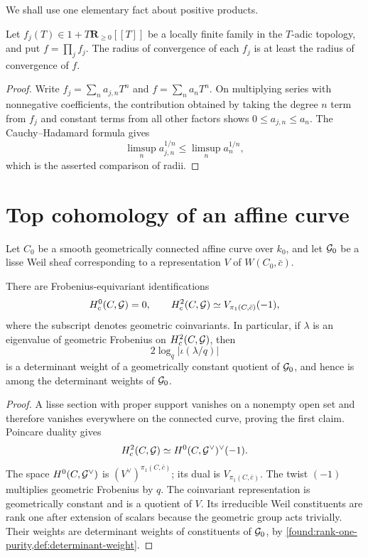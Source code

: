 We shall use one elementary fact about positive products.

\begin{lemma}
\label{lem:positive-product-radius}
Let \(f_j(T)\in1+T\mathbf R_{\geq0}[[T]]\) be a locally finite family in
the \(T\)-adic topology, and put \(f=\prod_j f_j\).  The radius of
convergence of each \(f_j\) is at least the radius of convergence of
\(f\).
\end{lemma}

\begin{proof}
Write \(f_j=\sum_na_{j,n}T^n\) and \(f=\sum_na_nT^n\).  On multiplying
series with nonnegative coefficients, the contribution obtained by
taking the degree \(n\) term from \(f_j\) and constant terms from all
other factors shows \(0\leq a_{j,n}\leq a_n\).  The
Cauchy--Hadamard formula gives
\[
  \limsup_n a_{j,n}^{1/n}
  \leq\limsup_n a_n^{1/n},
\]
which is the asserted comparison of radii.
\end{proof}

\section{Top cohomology of an affine curve}

Let \(C_0\) be a smooth geometrically connected affine curve over \(k_0\),
and let \(\mathcal G_0\) be a lisse Weil sheaf corresponding to a representation
\(V\) of \(W(C_0,\bar c)\).

\begin{lemma}
\label{lem:curve-hc0-hc2}
There are Frobenius-equivariant identifications
\[
  H_c^0(C,\mathcal G)=0,\qquad
  H_c^2(C,\mathcal G)\simeq
  V_{\pi_1(C,\bar c)}(-1),
\]
where the subscript denotes geometric coinvariants.  In particular, if
\(\lambda\) is an eigenvalue of geometric Frobenius on \(H_c^2(C,\mathcal G)\),
then
\[
  2\log_q|\iota(\lambda/q)|
\]
is a determinant weight of a geometrically constant quotient of
\(\mathcal G_0\), and hence is among the determinant weights of \(\mathcal G_0\).
\end{lemma}

\begin{proof}
A lisse section with proper support vanishes on a nonempty open set and
therefore vanishes everywhere on the connected curve, proving the first
claim.  Poincare duality gives
\[
 H_c^2(C,\mathcal G)
 \simeq H^0(C,\mathcal G^\vee)^\vee(-1).
\]
The space \(H^0(C,\mathcal G^\vee)\) is
\((V^\vee)^{\pi_1(C,\bar c)}\); its dual is
\(V_{\pi_1(C,\bar c)}\).  The twist \((-1)\) multiplies geometric
Frobenius by \(q\).  The coinvariant representation is geometrically
constant and is a quotient of \(V\).  Its irreducible Weil constituents
are rank one after extension of scalars because the geometric group acts
trivially.  Their weights are determinant weights of constituents of
\(\mathcal G_0\), by \cref{found:rank-one-purity,def:determinant-weight}.
\end{proof}

